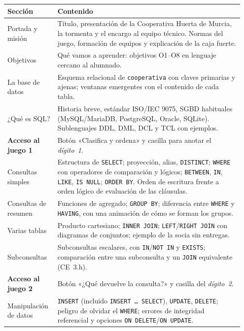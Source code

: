 \documentclass[11pt,a4paper]{article}
\begin{document}
\begin{longtable}{@{}p{0.2\linewidth}p{0.75\linewidth}@{}}
\toprule
\textbf{Sección} & \textbf{Contenido} \\
\midrule
\endhead
Portada y misión & Título, presentación de la Cooperativa Huerta de Murcia, la tormenta
y el encargo al equipo técnico. Normas del juego, formación de equipos y explicación de la
caja fuerte. \\
\addlinespace
Objetivos & Qué vamos a aprender: objetivos O1–O8 en lenguaje cercano al alumnado. \\
\addlinespace
La base de datos & Esquema relacional de \texttt{cooperativa} con claves primarias y
ajenas; ventanas emergentes con el contenido de cada tabla. \\
\addlinespace
¿Qué es SQL? & Historia breve, estándar ISO/IEC 9075, SGBD habituales (MySQL/MariaDB,
PostgreSQL, Oracle, SQLite). Sublenguajes DDL, DML, DCL y TCL con ejemplos. \\
\addlinespace
\textbf{Acceso al juego 1} & Botón «Clasifica y ordena» y casilla para anotar el
\emph{dígito~1}. \\
\addlinespace
Consultas simples & Estructura de \texttt{SELECT}; proyección, alias, \texttt{DISTINCT};
\texttt{WHERE} con operadores de comparación y lógicos; \texttt{BETWEEN}, \texttt{IN},
\texttt{LIKE}, \texttt{IS NULL}; \texttt{ORDER BY}. Orden de escritura frente a orden lógico
de evaluación de las cláusulas. \\
\addlinespace
Consultas de resumen & Funciones de agregado; \texttt{GROUP BY}; diferencia entre
\texttt{WHERE} y \texttt{HAVING}, con una animación de cómo se forman los grupos. \\
\addlinespace
Varias tablas & Producto cartesiano; \texttt{INNER JOIN}; \texttt{LEFT}/\texttt{RIGHT JOIN}
con diagramas de conjuntos; ejemplo de la socia sin entregas. \\
\addlinespace
Subconsultas & Subconsultas escalares, con \texttt{IN}/\texttt{NOT IN} y
\texttt{EXISTS}; comparación entre una subconsulta y un \texttt{JOIN} equivalente
(CE~3.h). \\
\addlinespace
\textbf{Acceso al juego 2} & Botón «¿Qué devuelve la consulta?» y casilla del
\emph{dígito~2}. \\
\addlinespace
Manipulación de datos & \texttt{INSERT} (incluido \texttt{INSERT \ldots{} SELECT}),
\texttt{UPDATE}, \texttt{DELETE}; peligro de olvidar el \texttt{WHERE}; errores de
integridad referencial y opciones \texttt{ON DELETE}/\texttt{ON UPDATE}. \\

\end{longtable}
\end{document}
